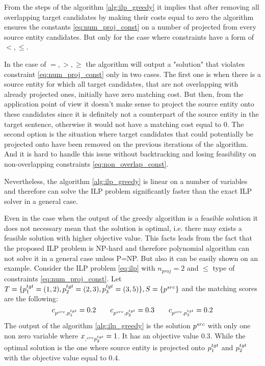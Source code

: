 From the steps of the algorithm \ref{alg:ilp_greedy} it implies that after removing all
overlapping target candidates by making their costs equal to zero the algorithm ensures the
constants \eqref{eq:num_proj_const} on a number of projected from every source entity candidates.
But only for the case where constraints have a form of \( <, \leq \).

In the case of \( =, >, \geq \) the algorithm will output a "solution" that violates constraint
\eqref{eq:num_proj_const} only in two cases. The first one is when there is a source entity for which
all target candidates, that are not overlapping with already projected ones, initially have zero matching cost. But then,
from the application point of view it doesn't make sense to project the source entity onto these candidates
since it is definitely not a counterpart of the source entity in the target sentence, otherwise it would not
have a matching cost equal to \( 0 \). The second option is the situation where target candidates
that could potentially be projected onto have been removed on the previous iterations of the algorithm.
And it is hard to handle this issue without backtracking and losing feasibility on
non-overlapping constraints \eqref{eq:non_overlap_const}.

Nevertheless, the algorithm \ref{alg:ilp_greedy} is linear on a number of variables and therefore can
solve the ILP problem significantly faster than the exact ILP solver in a general case.

Even in the case when the output of the greedy algorithm is a feasible solution it does not
necessary mean that the solution is optimal, i.e. there may exists a feasible solution with higher objective
value. This facts leads from the fact that the proposed ILP problem is NP-hard and therefore polynomial
algorithm can not solve it in a general case unless P=NP. But also it can be easily shown on an example.
Consider the ILP problem \eqref{eq:ilp} with \( n_{proj} = 2 \) and \( \leq \) type of constraints \eqref{eq:num_proj_const}.
Let \( T = \{ p_1^{tgt} = (1, 2), p_2^{tgt} = (2, 3), p_3^{tgt} = (3, 5) \}, S = \{ p^{src} \} \) and
the matching scores are the following:
\[
  c_{p^{src}, p_1^{tgt}} = 0.2 \qquad
  c_{p^{src}, p_2^{tgt}} = 0.3 \qquad
  c_{p^{src}, p_3^{tgt}} = 0.2
\]
The output of the algorithm \ref{alg:ilp_greedy} is the solution \( p^{src} \) with only one
non zero variable where \( x_{,^{src} p_2^{tgt}} = 1 \). It has an objective value \( 0.3 \).
While the optimal solution is the one where source entity is projected onto \( p_1^{tgt} \) and
\( p_2^{tgt} \) with the objective value equal to \( 0.4 \).
